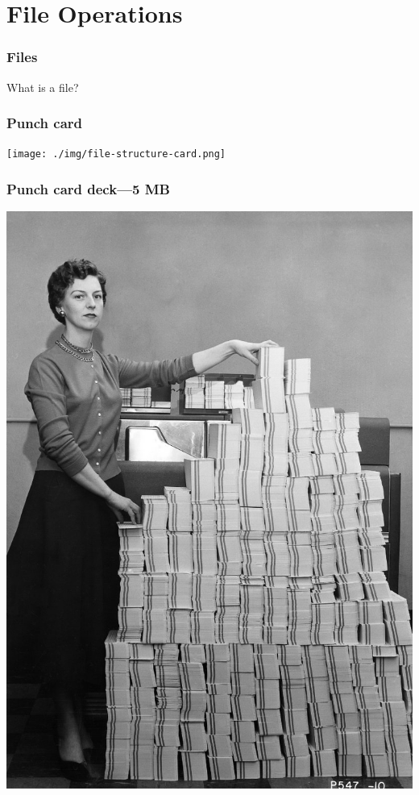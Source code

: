 \documentclass[11pt]{beamer}
\begin{document}
\section{File Operations}

\begin{frame}[fragile]
  \frametitle{Files}
  \Enlarge

  \begin{itemize}
  \myitem  What is a file?
  \end{itemize}
\end{frame}

\begin{frame}[fragile]
  \frametitle{Punch card}

  \texttt{[image: ./img/file-structure-card.png]}
\end{frame}


\begin{frame}[fragile]
  \frametitle{Punch card deck---5 MB}

  \includegraphics[height=0.75\textheight]{./img/file-structure-deck.png}
\end{frame}
\end{document}
